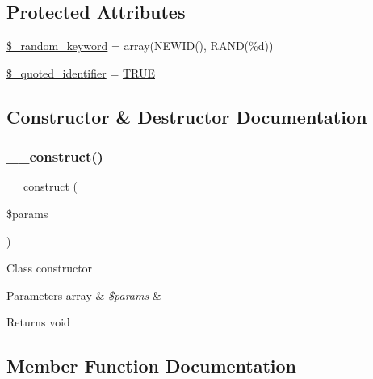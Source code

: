 \subsection*{Protected Attributes}
\begin{DoxyCompactItemize}
\item 
\mbox{\hyperlink{class_c_i___d_b__sqlsrv__driver_a10213aa6e05f6d924d3277bb1d2fea00}{\$\+\_\+random\+\_\+keyword}} = array(\textquotesingle{}N\+E\+W\+ID()\textquotesingle{}, \textquotesingle{}R\+A\+ND(\%d)\textquotesingle{})
\item 
\mbox{\hyperlink{class_c_i___d_b__sqlsrv__driver_a1dae2f0e9ad7299438a9976d6cdbf2ad}{\$\+\_\+quoted\+\_\+identifier}} = \mbox{\hyperlink{constants_8php_ae04a3efe6aa42044f803ee90c2277846}{T\+R\+UE}}
\end{DoxyCompactItemize}


\subsection{Constructor \& Destructor Documentation}
\mbox{\label{class_c_i___d_b__sqlsrv__driver_a9162320adff1a1a4afd7f2372f753a3e}} 
\subsubsection{\texorpdfstring{\+\_\+\+\_\+construct()}{\_\_construct()}}
{\footnotesize\ttfamily \+\_\+\+\_\+construct (\begin{DoxyParamCaption}\item[{}]{\$params }\end{DoxyParamCaption})}

Class constructor


\begin{DoxyParams}[1]{Parameters}
array & {\em \$params} & \\
\hline
\end{DoxyParams}
\begin{DoxyReturn}{Returns}
void 
\end{DoxyReturn}


\subsection{Member Function Documentation}
\mbox{\label{class_c_i___d_b__sqlsrv__driver_a4d9082658000e5ede8312067c6dda9db}} 
